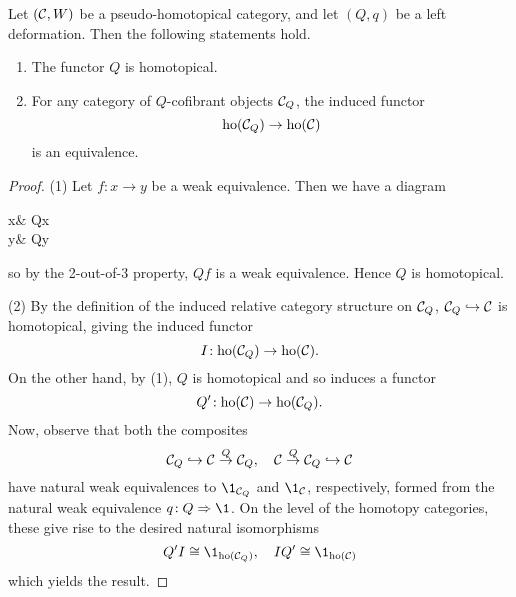 \begin{proposition}\label{prop:deformation-is-homotopical-and-cofibrant-objects-homotopy-equivalence}
	Let \((\mathcal{C},W)\) be a pseudo-homotopical category, and let \((Q,q)\) be a left deformation. Then the following statements hold.
	\begin{enumerate}[label=(\arabic*)]
	\item The functor \(Q\) is homotopical.
	\item For any category of \(Q\)-cofibrant objects \(\mathcal{C}_Q\), the induced functor
	\[ \operatorname{ho}(\mathcal{C}_Q) \to \operatorname{ho}(\mathcal{C}) \]
	is an equivalence.
	\end{enumerate}
\end{proposition}
\begin{proof}
(1) Let \(f\!:x\to y\) be a weak equivalence. Then we have a diagram
\begin{diagram*}
	x\ar[r,"q_x"]\ar[d,"f"'] & Qx\ar[d,"Qf"] \\
	y\ar[r,"q_y"] & Qy
\end{diagram*}
so by the 2-out-of-3 property, \(Qf\) is a weak equivalence. Hence \(Q\) is homotopical.

(2) By the definition of the induced relative category structure on \(\mathcal{C}_Q\), \(\mathcal{C}_Q\hookrightarrow\mathcal{C}\) is homotopical, giving the induced functor
\[ I\!:\operatorname{ho}(\mathcal{C}_Q)\to\operatorname{ho}(\mathcal{C}). \]
On the other hand, by (1), \(Q\) is homotopical and so induces a functor
\[ Q'\!:\operatorname{ho}(\mathcal{C})\to\operatorname{ho}(\mathcal{C}_Q). \]
Now, observe that both the composites
\[ \mathcal{C}_Q\hookrightarrow\mathcal{C}\overset{Q}\to\mathcal{C}_Q,\quad \mathcal{C}\overset{Q}\to\mathcal{C}_Q\hookrightarrow\mathcal{C} \]
have natural weak equivalences to \(\1_{\calC_Q}\) and \(\1_\calC\), respectively, formed from the natural weak equivalence \(q\!:Q\To\1\). On the level of the homotopy categories,
these give rise to the desired natural isomorphisms
\[ Q'I\cong\1_{\ho(\calC_Q)},\quad IQ'\cong\1_{\ho(\calC)} \]
which yields the result.
\end{proof}

